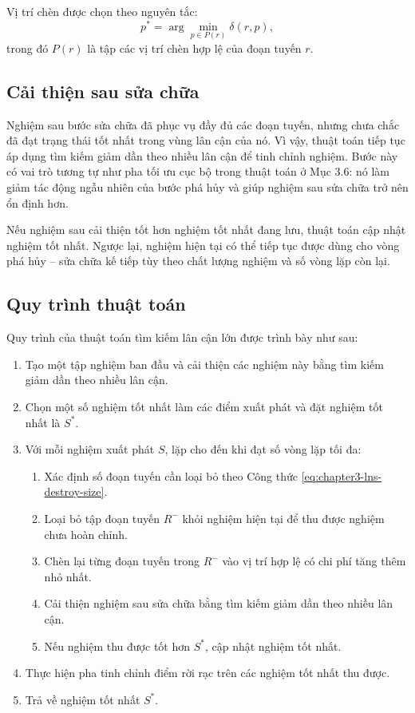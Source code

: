 Vị trí chèn được chọn theo nguyên tắc:
\begin{equation}
    p^* = \arg\min_{p \in P(r)} \delta(r,p),
    \label{eq:chapter3-lns-best-insertion}
\end{equation}
trong đó $P(r)$ là tập các vị trí chèn hợp lệ của đoạn tuyến $r$.

\subsection{Cải thiện sau sửa chữa}

Nghiệm sau bước sửa chữa đã phục vụ đầy đủ các đoạn tuyến, nhưng chưa chắc đã đạt trạng thái tốt nhất trong vùng lân cận của nó. Vì vậy, thuật toán tiếp tục áp dụng tìm kiếm giảm dần theo nhiều lân cận để tinh chỉnh nghiệm. Bước này có vai trò tương tự như pha tối ưu cục bộ trong thuật toán ở Mục 3.6: nó làm giảm tác động ngẫu nhiên của bước phá hủy và giúp nghiệm sau sửa chữa trở nên ổn định hơn.

Nếu nghiệm sau cải thiện tốt hơn nghiệm tốt nhất đang lưu, thuật toán cập nhật nghiệm tốt nhất. Ngược lại, nghiệm hiện tại có thể tiếp tục được dùng cho vòng phá hủy -- sửa chữa kế tiếp tùy theo chất lượng nghiệm và số vòng lặp còn lại.

\subsection{Quy trình thuật toán}

Quy trình của thuật toán tìm kiếm lân cận lớn được trình bày như sau:
\begin{enumerate}[leftmargin=1.2cm]
    \item Tạo một tập nghiệm ban đầu và cải thiện các nghiệm này bằng tìm kiếm giảm dần theo nhiều lân cận.
    \item Chọn một số nghiệm tốt nhất làm các điểm xuất phát và đặt nghiệm tốt nhất là $S^*$.
    \item Với mỗi nghiệm xuất phát $S$, lặp cho đến khi đạt số vòng lặp tối đa:
    \begin{enumerate}[label=(\alph*), leftmargin=1.2cm]
        \item Xác định số đoạn tuyến cần loại bỏ theo Công thức \eqref{eq:chapter3-lns-destroy-size}.
        \item Loại bỏ tập đoạn tuyến $R^-$ khỏi nghiệm hiện tại để thu được nghiệm chưa hoàn chỉnh.
        \item Chèn lại từng đoạn tuyến trong $R^-$ vào vị trí hợp lệ có chi phí tăng thêm nhỏ nhất.
        \item Cải thiện nghiệm sau sửa chữa bằng tìm kiếm giảm dần theo nhiều lân cận.
        \item Nếu nghiệm thu được tốt hơn $S^*$, cập nhật nghiệm tốt nhất.
    \end{enumerate}
    \item Thực hiện pha tinh chỉnh điểm rời rạc trên các nghiệm tốt nhất thu được.
    \item Trả về nghiệm tốt nhất $S^*$.
\end{enumerate}

